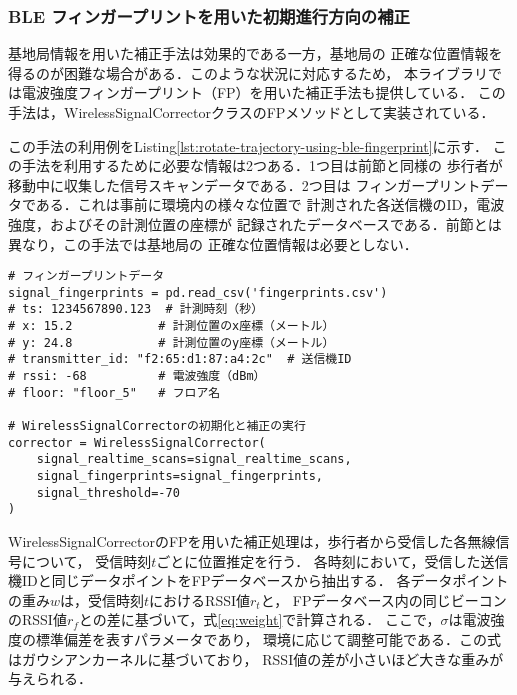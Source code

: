 
\subsubsection{BLE フィンガープリントを用いた初期進行方向の補正}

基地局情報を用いた補正手法は効果的である一方，基地局の
正確な位置情報を得るのが困難な場合がある．このような状況に対応するため，
本ライブラリでは電波強度フィンガープリント（FP）を用いた補正手法も提供している．
この手法は，WirelessSignalCorrectorクラスのFPメソッドとして実装されている．

この手法の利用例をListing\ref{lst:rotate-trajectory-using-ble-fingerprint}に示す．
この手法を利用するために必要な情報は2つある．1つ目は前節と同様の
歩行者が移動中に収集した信号スキャンデータである．2つ目は
フィンガープリントデータである．これは事前に環境内の様々な位置で
計測された各送信機のID，電波強度，およびその計測位置の座標が
記録されたデータベースである．前節とは異なり，この手法では基地局の
正確な位置情報は必要としない．

\begin{lstlisting}[caption={WirelessSignalCorrectorの使用例},label=lst:rotate-trajectory-using-fingerprint,float=ht]
# フィンガープリントデータ
signal_fingerprints = pd.read_csv('fingerprints.csv')
# ts: 1234567890.123  # 計測時刻（秒）
# x: 15.2            # 計測位置のx座標（メートル）
# y: 24.8            # 計測位置のy座標（メートル）
# transmitter_id: "f2:65:d1:87:a4:2c"  # 送信機ID
# rssi: -68          # 電波強度（dBm）
# floor: "floor_5"   # フロア名

# WirelessSignalCorrectorの初期化と補正の実行
corrector = WirelessSignalCorrector(
    signal_realtime_scans=signal_realtime_scans,
    signal_fingerprints=signal_fingerprints,
    signal_threshold=-70
)
\end{lstlisting}


WirelessSignalCorrectorのFPを用いた補正処理は，歩行者から受信した各無線信号について，
受信時刻$t$ごとに位置推定を行う．
各時刻において，受信した送信機IDと同じデータポイントをFPデータベースから抽出する．
各データポイントの重み$w$は，受信時刻$t$におけるRSSI値$r_t$と，
FPデータベース内の同じビーコンのRSSI値$r_f$との差に基づいて，式\eqref{eq:weight}で計算される．
ここで，$\sigma$は電波強度の標準偏差を表すパラメータであり，
環境に応じて調整可能である．この式はガウシアンカーネルに基づいており，
RSSI値の差が小さいほど大きな重みが与えられる．

